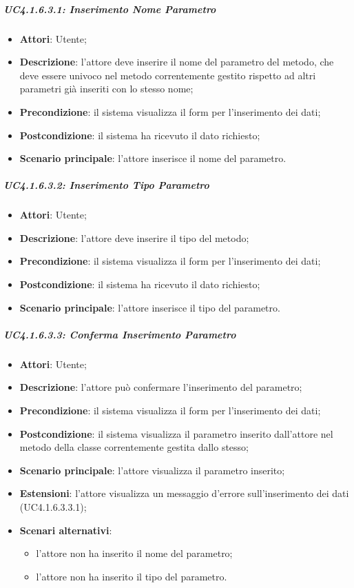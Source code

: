 \subparagraph{UC4.1.6.3.1: Inserimento Nome Parametro}
\label{UC4.1.6.3.1}
\begin{itemize}
\item \textbf{Attori}: Utente;
\item \textbf{Descrizione}: l'attore deve inserire il nome del parametro del metodo, che deve essere univoco nel metodo correntemente gestito rispetto ad altri parametri già inseriti con lo stesso nome;
\item \textbf{Precondizione}: il sistema visualizza il form per l'inserimento dei dati;
\item \textbf{Postcondizione}: il sistema ha ricevuto il dato richiesto;
\item \textbf{Scenario principale}:
l'attore inserisce il nome del parametro.
\end{itemize}

\subparagraph{UC4.1.6.3.2: Inserimento Tipo Parametro}
\label{UC4.1.6.3.2}
\begin{itemize}
\item \textbf{Attori}: Utente;
\item \textbf{Descrizione}: l'attore deve inserire il tipo del metodo;
\item \textbf{Precondizione}: il sistema visualizza il form per l'inserimento dei dati;	
\item \textbf{Postcondizione}: il sistema ha ricevuto il dato richiesto;	
\item \textbf{Scenario principale}:
l'attore inserisce il tipo del parametro.
\end{itemize}

\subparagraph{UC4.1.6.3.3: Conferma Inserimento Parametro}
\label{UC4.1.6.3.3}
\begin{itemize}
\item \textbf{Attori}: Utente;
\item \textbf{Descrizione}: l'attore può confermare l'inserimento del parametro;
\item \textbf{Precondizione}: il sistema visualizza il form per l'inserimento dei dati;	
\item \textbf{Postcondizione}: il sistema visualizza il parametro inserito dall'attore nel metodo della classe correntemente gestita dallo stesso;	
\item \textbf{Scenario principale}:
l'attore visualizza il parametro inserito;
\item \textbf{Estensioni}:
l'attore visualizza un messaggio d'errore sull'inserimento dei dati (UC4.1.6.3.3.1);
\item \textbf{Scenari alternativi}:
\begin{itemize}
	\item l'attore non ha inserito il nome del parametro;
	\item l'attore non ha inserito il tipo del parametro.
\end{itemize}
\end{itemize}

